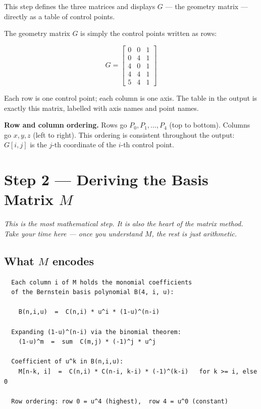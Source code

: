 \documentclass[12pt, a4paper]{article}
\begin{document}
This step defines the three matrices and displays $G$ ---
the geometry matrix --- directly as a table of control points.

The geometry matrix $G$ is simply the control points
written as rows:

\[
  G = \begin{bmatrix}
    0 & 0 & 1 \\
    0 & 4 & 1 \\
    4 & 0 & 1 \\
    4 & 4 & 1 \\
    5 & 4 & 1
  \end{bmatrix}
\]

Each row is one control point; each column is one axis.
The table in the output is exactly this matrix, labelled
with axis names and point names.

\begin{notebox}
\textbf{Row and column ordering.}
Rows go $P_0, P_1, \ldots, P_4$ (top to bottom).
Columns go $x, y, z$ (left to right).
This ordering is consistent throughout the output:
$G[i, j]$ is the $j$-th coordinate of the $i$-th control point.
\end{notebox}


\section{Step 2 --- Deriving the Basis Matrix $M$}

\textit{This is the most mathematical step.
It is also the heart of the matrix method.
Take your time here --- once you understand $M$,
the rest is just arithmetic.}

\subsection{What $M$ encodes}

\begin{verbatim}
  Each column i of M holds the monomial coefficients
  of the Bernstein basis polynomial B(4, i, u):

    B(n,i,u)  =  C(n,i) * u^i * (1-u)^(n-i)

  Expanding (1-u)^(n-i) via the binomial theorem:
    (1-u)^m  =  sum  C(m,j) * (-1)^j * u^j

  Coefficient of u^k in B(n,i,u):
    M[n-k, i]  =  C(n,i) * C(n-i, k-i) * (-1)^(k-i)   for k >= i, else 0

  Row ordering: row 0 = u^4 (highest),  row 4 = u^0 (constant)
\end{verbatim}
\end{document}
